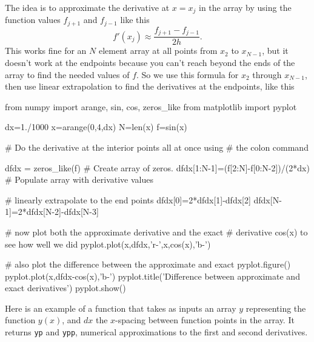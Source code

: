 The idea is to approximate the derivative at $x=x_j$ in the array by using
the function values $f_{j+1}$ and $f_{j-1}$ like this
\begin{equation}
f'(x_j) \approx \frac{f_{j+1}-f_{j-1} }{ 2 h} .
\end{equation}
This works fine for an $N$ element array at all points from $x_2$ to
$x_{N-1}$, but it doesn't work at the endpoints because you can't reach
beyond the ends of the array to find the needed values of $f$. So we use this
formula for $x_2$ through $x_{N-1}$, then use linear extrapolation to find
the derivatives at the endpoints, like this
\begin{codeexample}
\begin{VerbatimOut}{\listingFile}
from numpy import arange, sin, cos, zeros_like
from matplotlib import pyplot

dx=1./1000
x=arange(0,4,dx)
N=len(x)
f=sin(x)

# Do the derivative at the interior points all at once using
# the colon command

dfdx = zeros_like(f)  # Create array of zeros.
dfdx[1:N-1]=(f[2:N]-f[0:N-2])/(2*dx)  # Populate array with derivative values

# linearly extrapolate to the end points
dfdx[0]=2*dfdx[1]-dfdx[2]
dfdx[N-1]=2*dfdx[N-2]-dfdx[N-3]

# now plot both the approximate derivative and the exact
# derivative cos(x) to see how well we did
pyplot.plot(x,dfdx,'r-',x,cos(x),'b-')

# also plot the difference between the approximate and exact
pyplot.figure()
pyplot.plot(x,dfdx-cos(x),'b-')
pyplot.title('Difference between approximate and exact derivatives')
pyplot.show()
\end{VerbatimOut}
\end{codeexample}

Here is an example of a function that takes as inputs an array $y$
representing the function $y(x)$, and $dx$ the $x$-spacing between function
points in the array. It returns {\tt yp} and {\tt ypp}, numerical
approximations to the first and second derivatives. 

